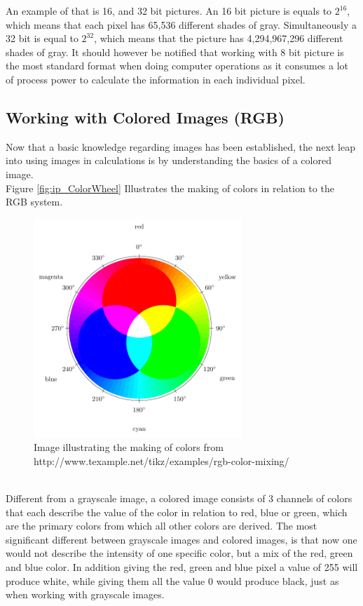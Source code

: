 An example of that is 16, and 32 bit pictures. An 16 bit picture is equals to $2^{16}$, which means that each pixel has 65,536 different shades of gray. Simultaneously a 32 bit is equal to $2^{32}$, which means that the picture has 4,294,967,296 different shades of gray. It should however be notified that working with 8 bit picture is the most standard format when doing computer operations as it consumes a lot of process power to calculate the information in each individual pixel.
 
\subsection{Working with Colored Images (RGB)}
Now that a basic knowledge regarding images has been established, the next leap into using images in calculations is by understanding the basics of a colored image.\\
Figure \eqref{fig:ip_ColorWheel} Illustrates the making of colors in relation to the RGB system.\\
\begin{figure}[htbp]
\centering
\includegraphics[width=0.70\textwidth]{Pictures/Theory/RGBColor.pdf}
\caption{Image illustrating the making of colors from http://www.texample.net/tikz/examples/rgb-color-mixing/}
\label{fig:ip_ColorWheel}
\end{figure}\\
Different from a grayscale image, a colored image consists of 3 channels of colors that each describe the value of the color in relation to red, blue or green, which are the primary colors from which all other colors are derived. The most significant different between grayscale images and colored images, is that now one would not describe the intensity of one specific color, but a mix of the red, green and blue color. In addition giving the red, green and blue pixel a value of 255 will produce white, while giving them all the value 0 would produce black, just as when working with grayscale images.\\
